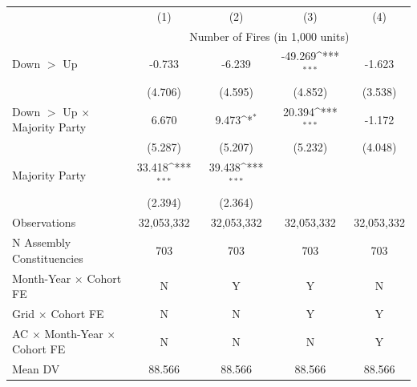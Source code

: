 {
\def\sym#1{\ifmmode^{#1}\else\(^{#1}\)\fi}
\begin{tabular}{l*{4}{c}}
\hline
            &\multicolumn{1}{c}{(1)} &\multicolumn{1}{c}{(2)} &\multicolumn{1}{c}{(3)} &\multicolumn{1}{c}{(4)} \\
            & \multicolumn{4}{c}{Number of Fires (in 1,000 units)} \\ \hline

Down $>$ Up &      -0.733         &      -6.239         &     -49.269\sym{***}&      -1.623         \\
            &     (4.706)         &     (4.595)         &     (4.852)         &     (3.538)         \\
Down $>$ Up $\times$ Majority Party&       6.670         &       9.473\sym{*}  &      20.394\sym{***}&      -1.172         \\
            &     (5.287)         &     (5.207)         &     (5.232)         &     (4.048)         \\
Majority Party&      33.418\sym{***}&      39.438\sym{***}&                     &                     \\
            &     (2.394)         &     (2.364)         &                     &                     \\
\hline
Observations&  32,053,332         &  32,053,332         &  32,053,332         &  32,053,332         \\
N Assembly Constituencies&         703         &         703         &         703         &         703         \\
Month-Year $\times$ Cohort FE&           N         &           Y         &           Y         &           N         \\
Grid $\times$ Cohort FE&           N         &           N         &           Y         &           Y         \\
AC $\times$ Month-Year $\times$ Cohort FE&           N         &           N         &           N         &           Y         \\
Mean DV     &      88.566         &      88.566         &      88.566         &      88.566         \\
\hline
\end{tabular}
}
